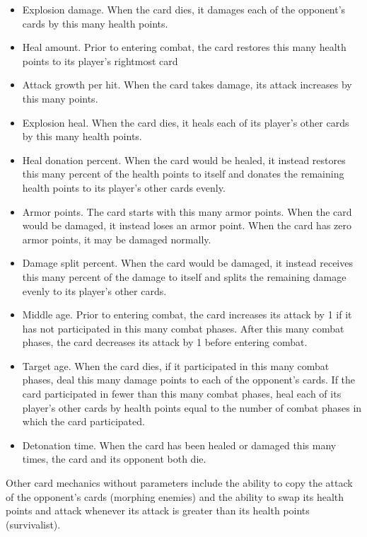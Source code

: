 \begin{itemize}
	\item Explosion damage. When the card dies, it damages
	each of the opponent's cards by this many health points.
	\item Heal amount. Prior to entering combat, the card 
	restores this many health points to its player's rightmost
	card
	\item Attack growth per hit. When the card takes damage, its
	attack increases by this many points.
	\item Explosion heal. When the card dies, it heals
	each of its player's other cards by this many health points.
	\item Heal donation percent. When the card would be healed,
	it instead restores this many percent of the health points
	to itself and donates the remaining health points to its
	player's other cards evenly.
	\item Armor points. The card starts with this many armor points.
	When the card would be damaged, it instead loses an armor point.
	When the card has zero armor points, it may be damaged normally.
	\item Damage split percent. When the card would be damaged,
	it instead receives this many percent of the damage to itself
	and splits the remaining damage evenly to its player's other cards.
	\item Middle age. Prior to entering combat, the card increases its
	attack by 1 if it has not participated in this many combat phases.
	After this many combat phases, the card decreases its attack by 1
	before entering combat.
	\item Target age. When the card dies, if it participated in this many
	combat phases, deal this many damage points to each of the opponent's
	cards. If the card participated in fewer than this many combat phases, 
	heal each of its player's other cards by health points equal to the
	number of combat phases in which the card participated.
	\item Detonation time. When the card has been healed or damaged this
	many times, the card and its opponent both die.
\end{itemize}

Other card mechanics without parameters include the ability to copy the 
attack of the opponent's cards (morphing enemies) and the ability to swap 
its health points and attack whenever its attack is greater than its health 
points (survivalist).

